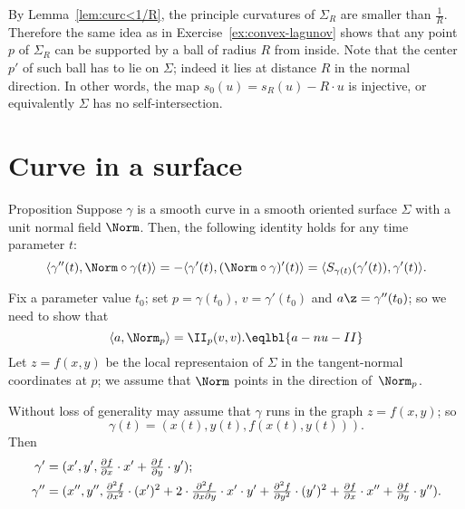 By Lemma~\ref{lem:curc<1/R}, the principle curvatures of $\Sigma_R$ are smaller than $\tfrac1R$.
Therefore the same idea as in Exercise~\ref{ex:convex-lagunov} shows that any point $p$ of $\Sigma_R$ can be supported by a ball of radius $R$ from inside.
Note that the center $p'$ of such ball has to lie on $\Sigma$;
indeed it lies at distance $R$ in the normal direction.
In other words, the map $s_0(u)=s_R(u)-R\cdot u$ is injective, or equivalently $\Sigma$  has no self-intersection.
\qeds





















\section*{Curve in a surface}


\begin{thm}{Proposition}\label{prop:gamma''=II}
Suppose $\gamma$ is a smooth curve in a smooth oriented surface $\Sigma$ with a unit normal field $\Norm$.
Then, the following identity holds for any time parameter $t$:
\[\langle \gamma''(t),\Norm\circ\gamma(t)\rangle=-\langle \gamma'(t),(\Norm\circ\gamma)'(t)\rangle=\langle S_{\gamma(t)}(\gamma'(t)),\gamma'(t)\rangle.\]

\end{thm}

Fix a parameter value $t_0$; set $p=\gamma(t_0)$, $v=\gamma'(t_0)$ and $a\z=\gamma''(t_0)$;
so we need to show that
\[\langle a,\Norm_{p}\rangle=\II_p(v,v).\eqlbl{a-nu-II}\]
Let $z=f(x,y)$ be the local representaion of $\Sigma$ in the tangent-normal coordinates at $p$;
we assume that $\Norm$ points in the direction of~$\Norm_p$.

Without loss of generality may assume that $\gamma$ runs in the graph $z=f(x,y)$;
so 
\[\gamma(t)=\left(x(t),y(t),f(x(t),y(t))\right).\]
Then
\begin{align*}
\gamma'&=(x',y',\tfrac{\partial f}{\partial x}\cdot x'+\tfrac{\partial f}{\partial y}\cdot y');
\\
\gamma''
&=
{\small(x'',
y'',
 \tfrac{\partial^2 f}{\partial x^2}\cdot (x')^2
+
2\cdot \tfrac{\partial^2 f}{\partial x\partial y}\cdot x'\cdot y'
+
\tfrac{\partial^2 f}{\partial y^2}\cdot (y')^2
+
\tfrac{\partial f}{\partial x}\cdot x''
+
\tfrac{\partial f}{\partial y}\cdot y'')}.
\end{align*}

